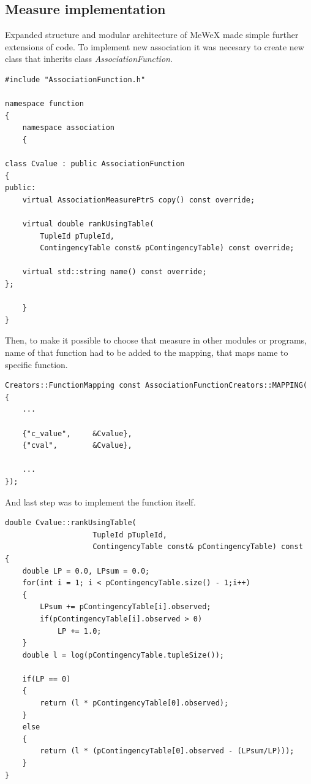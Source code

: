 \clearpage
\subsection{Measure implementation}
Expanded structure and modular architecture of MeWeX made simple further extensions of code. To implement new association 
it was necesary to create new class that inherits class \textit{AssociationFunction}.
\vspace{1em}
\begin{lstlisting}
#include "AssociationFunction.h"

namespace function
{
    namespace association
    {

class Cvalue : public AssociationFunction
{
public:
    virtual AssociationMeasurePtrS copy() const override;

    virtual double rankUsingTable(
        TupleId pTupleId,
        ContingencyTable const& pContingencyTable) const override;

    virtual std::string	name() const override;
};

    }
}
\end{lstlisting}
\vspace{1em}
Then, to make it possible to choose that measure in other modules or programs, name of that function had to be added to the mapping,
that maps name to specific function.
\vspace{1em}
\begin{lstlisting}
Creators::FunctionMapping const AssociationFunctionCreators::MAPPING(
{
    ...

    {"c_value",     &Cvalue},
    {"cval",        &Cvalue},

    ...
});
\end{lstlisting}
\clearpage
And last step was to implement the function itself.
\vspace{1em}
\begin{lstlisting}
double Cvalue::rankUsingTable(
                    TupleId pTupleId, 
                    ContingencyTable const& pContingencyTable) const
{
    double LP = 0.0, LPsum = 0.0;
    for(int i = 1; i < pContingencyTable.size() - 1;i++)
    {
        LPsum += pContingencyTable[i].observed;
        if(pContingencyTable[i].observed > 0)
            LP += 1.0;
    }
    double l = log(pContingencyTable.tupleSize());

    if(LP == 0)
    {
        return (l * pContingencyTable[0].observed);
    }
    else
    {
        return (l * (pContingencyTable[0].observed - (LPsum/LP)));
    }
}
\end{lstlisting}
\clearpage

